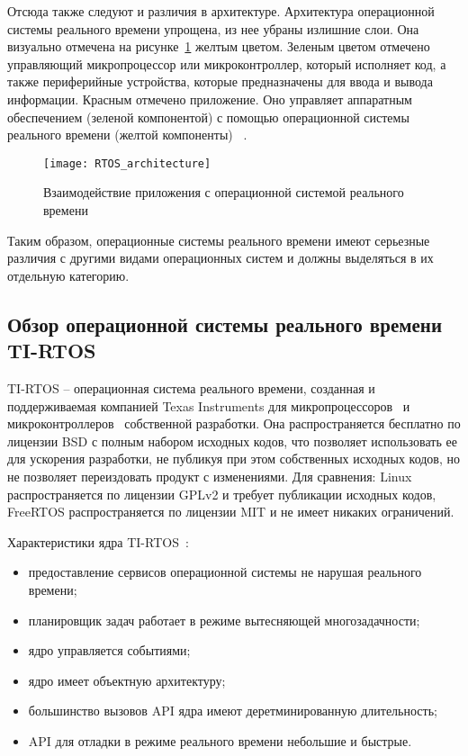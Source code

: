 Отсюда также следуют и различия в архитектуре. Архитектура операционной системы
реального времени упрощена, из нее убраны излишние слои.
Она визуально отмечена на рисунке~\ref{pic:lit_review:rtos_arch} желтым цветом.
Зеленым цветом отмечено управляющий микропроцессор или микроконтроллер, который
исполняет код, а также периферийные устройства, которые предназначены
для ввода и вывода информации. Красным отмечено приложение. Оно
управляет аппаратным обеспечением (зеленой компонентой) с помощью операционной
системы реального времени (желтой компоненты) ~\cite{rtos_arch_site}.

\begin{figure}
    \centering
    \texttt{[image: RTOS\_architecture]}
    \caption{Взаимодействие приложения с операционной системой реального времени}
    \label{pic:lit_review:rtos_arch}

\end{figure}


Таким образом, операционные системы реального времени имеют серьезные различия
с другими видами операционных систем и должны выделяться в их отдельную
категорию.

\subsection{Обзор операционной системы реального времени TI-RTOS}

TI-RTOS -- операционная система реального времени, созданная и поддерживаемая
компанией Texas Instruments для микропроцессоров~\cite{tirtos_proc_site} и
микроконтроллеров~\cite{tirtos_mcu_site} собственной разработки. Она
распространяется бесплатно по лицензии BSD с полным набором исходных кодов,
что позволяет использовать ее для ускорения разработки,
не публикуя при этом собственных исходных кодов, но не позволяет переиздовать
продукт с изменениями. Для сравнения:
Linux распространяется по лицензии GPLv2 и требует публикации
исходных кодов, FreeRTOS распространяется по лицензии MIT и не имеет никаких
ограничений.

Характеристики ядра TI-RTOS~\cite{ma_tirtos_kernel}:
\begin{itemize}
    \item предоставление сервисов операционной системы не нарушая реального времени;
    \item планировщик задач работает в режиме вытесняющей многозадачности;
    \item ядро управляется событиями;
    \item ядро имеет объектную архитектуру;
    \item большинство вызовов API ядра имеют деретминированную длительность;
    \item API для отладки в режиме реального времени небольшие и быстрые.
\end{itemize}

